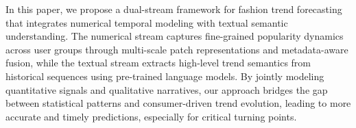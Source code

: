 \documentclass[Afour,sageh,times]{sagej}
\begin{document}
{%



In this paper, we propose a dual-stream framework for fashion trend forecasting that integrates numerical temporal modeling with textual semantic understanding. The numerical stream captures fine-grained popularity dynamics across user groups through multi-scale patch representations and metadata-aware fusion, while the textual stream extracts high-level trend semantics from historical sequences using pre-trained language models. By jointly modeling quantitative signals and qualitative narratives, our approach bridges the gap between statistical patterns and consumer-driven trend evolution, leading to more accurate and timely predictions, especially for critical turning points.

}
\end{document}
